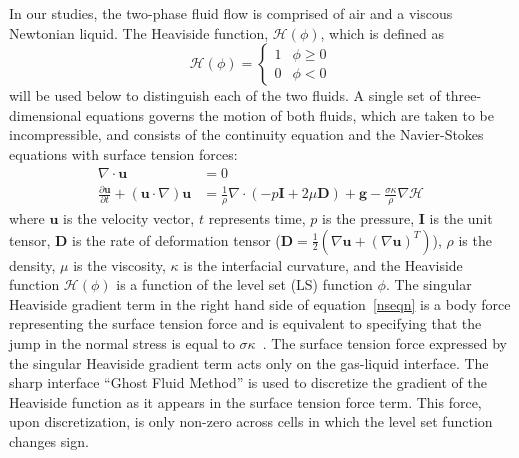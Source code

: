 \documentclass[%
 reprint,
 showkeys,
 amsmath,amssymb,
 aps,
 prfluids,
 onecolumn
]{revtex4-2}
\newcommand{\Hea}{\mathcal{H}}
\newcommand{\vv}{\mathbf}
\newcommand{\bmD}{\vv{D}}
\newcommand{\bmg}{\vv{g}}
\newcommand{\bmI}{\vv{I}}
\newcommand{\bmu}{\vv{u}}
\begin{document}
In our studies,
the two-phase fluid flow is comprised of air and a 
viscous Newtonian liquid.  
The Heaviside function, $\Hea(\phi)$, which is defined as
%
\begin{equation}\label{heavyeqn}
  \Hea(\phi) = \begin{cases}
               1 & \phi \geq 0 \\
               0 & \phi <0 
               \end{cases}
\end{equation}
%
will be used below to distinguish each of the two fluids.  A single set of
three-dimensional equations governs the motion of both fluids, which are taken
to be incompressible, and consists of the continuity equation and the
Navier-Stokes equations with surface tension forces:
%
\begin{align}
  \nabla\cdot\bmu &=0  \label{divu} \\
  \frac{\partial\bmu}{\partial t}+(\bmu\cdot\nabla)\bmu &=
  \frac{1}{\rho}\nabla\cdot(-p\bmI+2\mu\bmD)+\bmg-
  \frac{\sigma\kappa}{\rho}\nabla \Hea  
  \label{nseqn}
\end{align}
%
%
where $\bmu$ is the velocity vector, $t$ represents time, $p$ is the pressure,
$\bmI$ is the unit tensor, $\bmD$ is the rate of deformation tensor
($\bmD=\frac{1}{2}(\nabla\bmu+(\nabla\bmu)^{T})$), $\rho$ is the density, $\mu$
is the viscosity, $\kappa$ is the interfacial curvature, and the Heaviside
function $\Hea(\phi)$ is a function of the level set (LS) function $\phi$. The
singular Heaviside gradient term in the right hand side of equation~\eqref{nseqn} is a body 
force representing the surface tension force and is equivalent to specifying that the jump 
in the normal stress is equal to
$\sigma\kappa$~\cite{TanguyEtAl2007}. 
{\color{red} The surface tension force expressed 
by the singular Heaviside gradient term acts only on the 
gas-liquid interface. 
The sharp interface ``Ghost Fluid Method'' \cite{kang2000boundary}
is used to discretize the gradient of the Heaviside function as it 
appears in the surface tension force term.  This force, upon discretization,
is only non-zero across cells in which the level set function changes
sign. }
\end{document}
